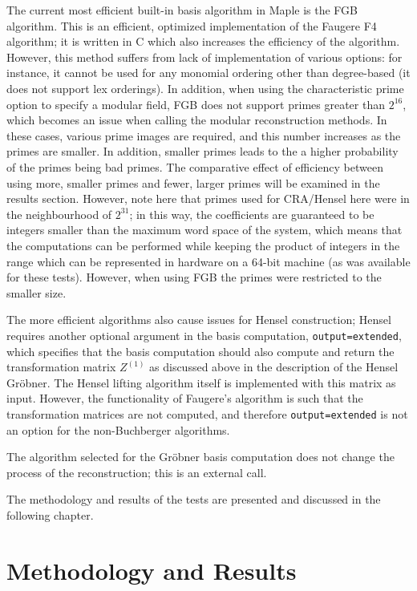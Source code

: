 \documentclass[letterpaper,12pt,titlepage,oneside,final]{book}
\begin{document}
The current most efficient built-in basis algorithm in Maple is the FGB algorithm.  This is an efficient, optimized implementation of the Faugere F4 algorithm; it is written in C which also increases the efficiency of the algorithm.  However, this method suffers from lack of implementation of various options: for instance, it cannot be used for any monomial ordering other than degree-based (it does not support lex orderings).  In addition, when using the characteristic prime option to specify a modular field, FGB does not support primes greater than ${2^{16}}$, which becomes an issue when calling the modular reconstruction methods.  In these cases, various prime images are required, and this number increases as the primes are smaller.  In addition, smaller primes leads to the a higher probability of the primes being bad primes.  The comparative effect of efficiency between using more, smaller primes and fewer, larger primes will be examined in the results section.  However, note here that primes used for CRA/Hensel here were in the neighbourhood of ${2^{31}}$; in this way, the coefficients are guaranteed to be integers smaller than the maximum word space of the system, which means that the computations can be performed while keeping the product of integers in the range which can be represented in hardware on a 64-bit machine (as was available for these tests).  However, when using FGB the primes were restricted to the smaller size.

The more efficient algorithms also cause issues for Hensel construction; Hensel requires another optional argument in the basis computation, \texttt{output=extended}, which specifies that the basis computation should also compute and return the transformation matrix ${Z^{(1)}}$ as discussed above in the description of the Hensel Gr\"obner.  The Hensel lifting algorithm itself is implemented with this matrix as input.  However, the functionality of Faugere's algorithm is such that the transformation matrices are not computed, and therefore \texttt{output=extended} is not an option for the non-Buchberger algorithms.  

The algorithm selected for the Gr\"obner basis computation does not change the process of the reconstruction; this is an external call.



The methodology and results of the tests are presented and discussed in the following chapter.

\chapter{Methodology and Results}\label{MethAndRes}
\end{document}
